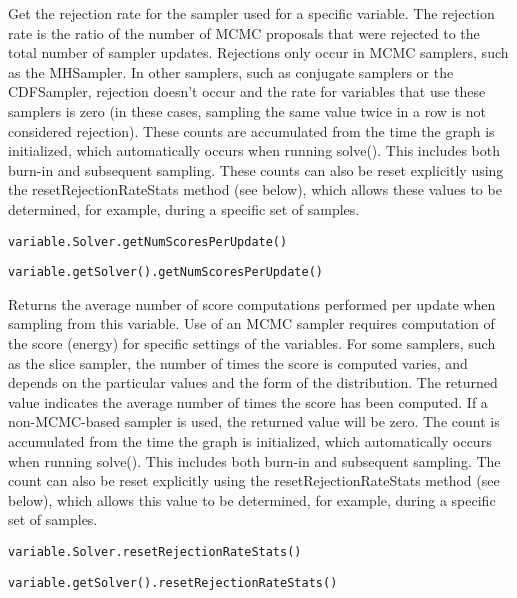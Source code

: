 Get the rejection rate for the sampler used for a specific variable.  The rejection rate is the ratio of the number of MCMC proposals that were rejected to the total number of sampler updates.  Rejections only occur in MCMC samplers, such as the MHSampler.  In other samplers, such as conjugate samplers or the CDFSampler, rejection doesn't occur and the rate for variables that use these samplers is zero (in these cases, sampling the same value twice in a row is not considered rejection).  These counts are accumulated from the time the graph is initialized, which automatically occurs when running solve().  This includes both burn-in and subsequent sampling.  These counts can also be reset explicitly using the resetRejectionRateStats method (see below), which allows these values to be determined, for example, during a specific set of samples.


\ifmatlab
\begin{lstlisting}
variable.Solver.getNumScoresPerUpdate()
\end{lstlisting}
\fi

\ifjava
\begin{lstlisting}
variable.getSolver().getNumScoresPerUpdate()
\end{lstlisting}
\fi

Returns the average number of score computations performed per update when sampling from this variable.  Use of an MCMC sampler requires computation of the score (energy) for specific settings of the variables.  For some samplers, such as the slice sampler, the number of times the score is computed varies, and depends on the particular values and the form of the distribution.  The returned value indicates the average number of times the score has been computed.  If a non-MCMC-based sampler is used, the returned value will be zero.  The count is accumulated from the time the graph is initialized, which automatically occurs when running solve().  This includes both burn-in and subsequent sampling.  The count can also be reset explicitly using the resetRejectionRateStats method (see below), which allows this value to be determined, for example, during a specific set of samples.

\ifmatlab
\begin{lstlisting}
variable.Solver.resetRejectionRateStats()
\end{lstlisting}
\fi

\ifjava
\begin{lstlisting}
variable.getSolver().resetRejectionRateStats()
\end{lstlisting}
\fi

